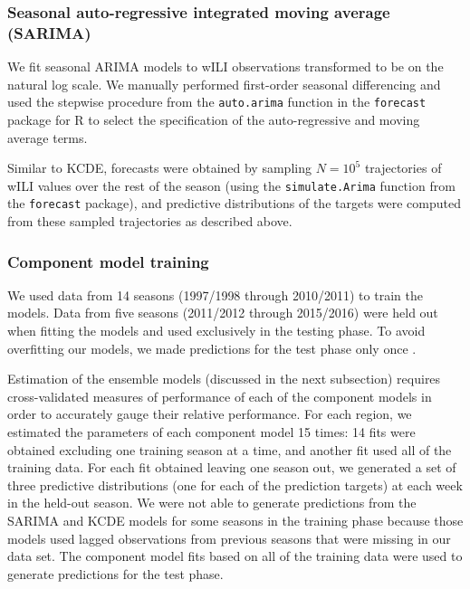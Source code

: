 \documentclass[10pt,letterpaper]{article}
\begin{document}
\subsubsection{Seasonal auto-regressive integrated moving average
(SARIMA)}\label{seasonal-auto-regressive-integrated-moving-average-sarima}

We fit seasonal ARIMA models \cite{Box2015} to wILI observations
transformed to be on the natural log scale. We manually performed
first-order seasonal differencing and used the stepwise procedure from
the \texttt{auto.arima} function in the \texttt{forecast} package
\cite{Hyndman2008} for R to select the specification of the
auto-regressive and moving average terms.

Similar to KCDE, forecasts were obtained by sampling \(N = 10^5\)
trajectories of wILI values over the rest of the season (using the
\texttt{simulate.Arima} function from the \texttt{forecast} package),
and predictive distributions of the targets were computed from these
sampled trajectories as described above.

\subsubsection{Component model training}\label{component-model-training}

We used data from 14 seasons (1997/1998 through 2010/2011) to train the
models. Data from five seasons (2011/2012 through 2015/2016) were held
out when fitting the models and used exclusively in the testing phase.
To avoid overfitting our models, we made predictions for the test phase
only once \cite{Hastie2011}.

Estimation of the ensemble models (discussed in the next subsection)
requires cross-validated measures of performance of each of the
component models in order to accurately gauge their relative
performance. For each region, we estimated the parameters of each
component model 15 times: 14 fits were obtained excluding one training
season at a time, and another fit used all of the training data. For
each fit obtained leaving one season out, we generated a set of three
predictive distributions (one for each of the prediction targets) at
each week in the held-out season. We were not able to generate
predictions from the SARIMA and KCDE models for some seasons in the
training phase because those models used lagged observations from
previous seasons that were missing in our data set. The component model
fits based on all of the training data were used to generate predictions
for the test phase.
\end{document}
